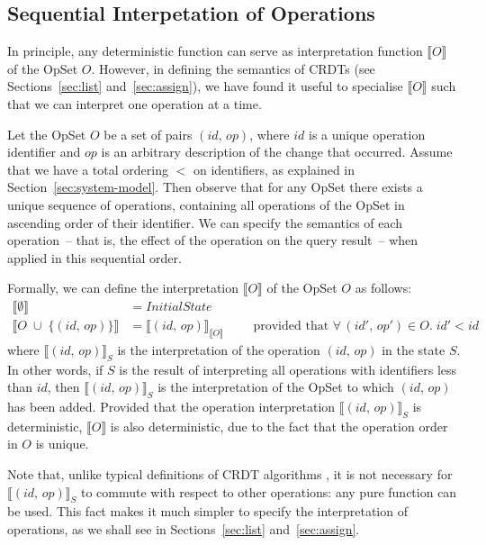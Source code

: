 \subsection{Sequential Interpetation of Operations}\label{sec:op-serial}

In principle, any deterministic function can serve as interpretation function $\llbracket O \rrbracket$ of the OpSet $O$.
However, in defining the semantics of CRDTs (see Sections~\ref{sec:list} and~\ref{sec:assign}), we have found it useful to specialise $\llbracket O \rrbracket$ such that we can interpret one operation at a time.

Let the OpSet $O$ be a set of pairs $(\mathit{id},\, \mathit{op})$, where $\mathit{id}$ is a unique operation identifier and $\mathit{op}$ is an arbitrary description of the change that occurred.
Assume that we have a total ordering $<$ on identifiers, as explained in Section~\ref{sec:system-model}.
Then observe that for any OpSet there exists a unique sequence of operations, containing all operations of the OpSet in ascending order of their identifier.
We can specify the semantics of each operation~-- that is, the effect of the operation on the query result~-- when applied in this sequential order.

Formally, we can define the interpretation $\llbracket O \rrbracket$ of the OpSet $O$ as follows:
\begin{align*}
    \big\llbracket \emptyset \big\rrbracket &= \mathit{InitialState} \\
    \big\llbracket O \;\cup\; \{(\mathit{id},\, \mathit{op})\} \big\rrbracket &=
    \big\llbracket (\mathit{id},\, \mathit{op}) \big\rrbracket_{\llbracket O \rrbracket}
    \qquad\text{ provided that } \forall\,(\mathit{id}',\, \mathit{op}') \in O.\; \mathit{id}' < \mathit{id}
\end{align*}
where $\llbracket (\mathit{id},\, \mathit{op}) \rrbracket_S$ is the interpretation of the operation $(\mathit{id},\, \mathit{op})$ in the state $S$.
In other words, if $S$ is the result of interpreting all operations with identifiers less than $\mathit{id}$, then
$\llbracket (\mathit{id},\, \mathit{op}) \rrbracket_S$ is the interpretation of the OpSet to which $(\mathit{id},\, \mathit{op})$ has been added.
Provided that the operation interpretation $\llbracket (\mathit{id},\, \mathit{op}) \rrbracket_S$ is deterministic, $\llbracket O \rrbracket$ is also deterministic, due to the fact that the operation order in $O$ is unique.

Note that, unlike typical definitions of CRDT algorithms \cite{Shapiro:2011wy,Shapiro:2011un}, it is not necessary for $\llbracket (\mathit{id},\, \mathit{op}) \rrbracket_S$ to commute with respect to other operations: any pure function can be used.
This fact makes it much simpler to specify the interpretation of operations, as we shall see in Sections~\ref{sec:list} and~\ref{sec:assign}.

